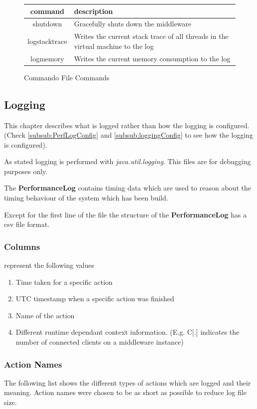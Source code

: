 \documentclass[a4paper]{article}
\begin{document}
\begin{figure}[H]
  \begin{center}
\begin{tabular}{|c|l|}
\hline 
command & description \\ 
\hline 
shutdown & Gracefully shuts down the middleware \\ 
logstacktrace & Writes the current stack trace of all threads in the virtual machine to the log \\ 
logmemory & Writes the current memory consumption to the log \\ 
\hline
\end{tabular} 
  \end{center}
  \caption{Commando File Commands}
\end{figure}


\subsection{Logging}
This chapter describes what is logged rather than how the logging is configured. (Check \ref{subsub:PerfLogConfig} and \ref{subsub:loggingConfig} to see how the logging is configured).

As stated logging is performed with \textit{java.util.logging}. This files are for debugging purposes only.

The \textbf{PerformanceLog} contains timing data which are used to reason about the timing behaviour of the system which has been build.

Except for the first line of the file the structure of the \textbf{PerformanceLog} has a csv file format.


\subsubsection{Columns} represent the following values
\begin{enumerate}
\item Time taken for a specific action
\item UTC timestamp when a specific action was finished
\item Name of the action
\item Different runtime dependant context information. (E.g. C[.] indicates the number of connected clients on a middleware instance)
\end{enumerate}

\subsubsection{Action Names}
\label{subsub:PerfLogger-ActionNames}
The following list shows the different types of actions which are logged and their meaning. Action names were chosen to be as short as possible to reduce log file size.
\end{document}
